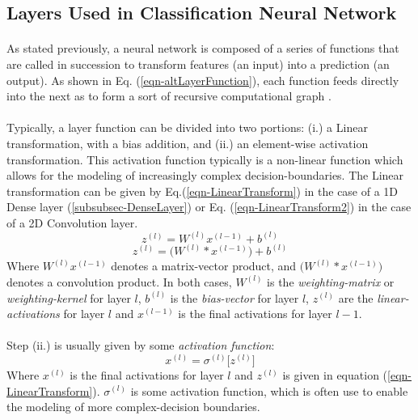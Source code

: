 \documentclass[12pt,letterpaper]{article}
\begin{document}

\subsection{Layers Used in Classification Neural Network}
\label{subsec-Layers}

\paragraph*{}As stated previously, a neural network is composed of a series of functions that are called in succession to transform features (an input) into a prediction (an output). As shown in Eq. (\ref{eqn-altLayerFunction}), each function feeds directly into the next as to form a sort of recursive computational graph \cite{Goodfellow}. 

\paragraph*{}Typically, a layer function can be divided into two portions: (i.) a Linear transformation, with a bias addition, and (ii.) an element-wise activation transformation. This activation function typically is a non-linear function which allows for the modeling of increasingly complex decision-boundaries. The Linear transformation can be given by Eq.(\ref{eqn-LinearTransform}) in the case of a 1D Dense layer (\ref{subsubsec-DenseLayer}) or Eq. (\ref{eqn-LinearTransform2}) in the case of a 2D Convolution layer.
\begin{equation}
\label{eqn-LinearTransform}
z^{(l)} = W^{(l)} x^{(l-1)} + b^{(l)}
\end{equation}
\begin{equation}
\label{eqn-LinearTransform2}
z^{(l)} = \big(W^{(l)} * x^{(l-1)}\big) + b^{(l)}
\end{equation} 
Where $W^{(l)} x^{(l-1)}$ denotes a matrix-vector product, and $\big(W^{(l)} * x^{(l-1)}\big)$ denotes a convolution product. In both cases, $W^{(l)}$ is the \textit{weighting-matrix} or \textit{weighting-kernel} for layer $l$, $b^{(l)}$ is the \textit{bias-vector} for layer $l$, $z^{(l)}$ are the \textit{linear-activations} for layer $l$ and $x^{(l-1)}$ is the final activations for layer $l-1$.

\paragraph*{}Step (ii.) is usually given by some \textit{activation function}:
\begin{equation}
\label{eqn-elementActivation}
x^{(l)} = \sigma^{(l)} \big[ z^{(l)} \big]
\end{equation}
Where $x^{(l)}$ is the final activations for layer $l$ and $z^{(l)}$ is given in equation (\ref{eqn-LinearTransform}). $\sigma^{(l)}$ is some activation function, which is often use to enable the modeling of more complex-decision boundaries. 
\end{document}
